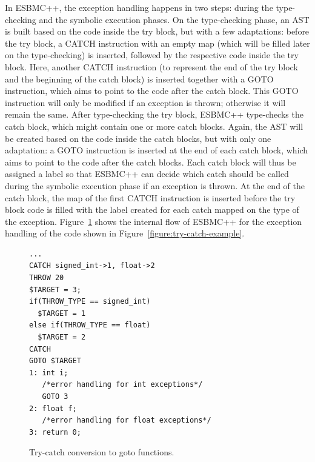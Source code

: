 \documentclass[conference]{IEEEtran}
\begin{document}
In ESBMC++, the exception handling happens in two steps:
during the type-checking and the symbolic execution phases.
On the type-checking phase, an AST is built based on the code
inside the try block, but with a few adaptations: before the try block, 
a CATCH instruction with an empty map (which will be filled later on 
the type-checking) is inserted, followed by the respective code inside 
the try block. Here, another CATCH instruction (to represent the end of the 
try block and the beginning of the catch block) is inserted together with 
a GOTO instruction, which aims to point to the code after the catch block. 
This GOTO instruction will only be modified if an exception is thrown;
otherwise it will remain the same. After type-checking the try block,
ESBMC++ type-checks the catch block, which might contain one or more catch blocks.
Again, the AST will be created based on the code inside the catch blocks, but
with only one adaptation: a GOTO instruction is inserted at the end of
each catch block, which aims to point to the code after the catch blocks. Each catch block
will thus be assigned a label so that ESBMC++ can decide which catch should be called
during the symbolic execution phase if an exception is thrown. At the end
of the catch block, the map of the first CATCH instruction is
inserted before the try block code is filled with the label created
for each catch mapped on the type of the exception. Figure~\ref{figure:try-catch-goto}
shows the internal flow of ESBMC++ for the exception handling of the code shown in
Figure~\ref{figure:try-catch-example}.

\begin{figure}[ht]
\centering
\begin{minipage}{0.45\textwidth}
\begin{lstlisting}
...
CATCH signed_int->1, float->2
THROW 20
$TARGET = 3;
if(THROW_TYPE == signed_int)
  $TARGET = 1
else if(THROW_TYPE == float)
  $TARGET = 2
CATCH
GOTO $TARGET
1: int i; 
   /*error handling for int exceptions*/
   GOTO 3
2: float f;
   /*error handling for float exceptions*/ 
3: return 0;
\end{lstlisting}
\end{minipage}
\caption{Try-catch conversion to goto functions.}
\label{figure:try-catch-goto} 
\end{figure}
\end{document}
